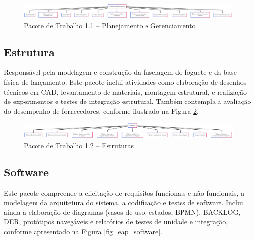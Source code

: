 \begin{figure}[H]
	\centering
\includegraphics[width=15cm]{figuras/eap_planejamento.png}
	\caption{Pacote de Trabalho 1.1 – Planejamento e Gerenciamento}
	\label{fig_eap_planejamento} 
\end{figure}

\subsection{Estrutura}

Responsável pela modelagem e construção da fuselagem do foguete e da base física de lançamento. Este pacote inclui atividades como elaboração de desenhos técnicos em CAD, levantamento de materiais, montagem estrutural, e realização de experimentos e testes de integração estrutural. Também contempla a avaliação do desempenho de fornecedores, conforme ilustrado na Figura \ref{fig_eap_estruturas}.

\begin{figure}[H]
	\centering
\includegraphics[width=15cm]{figuras/eap_estruturas.png}
	\caption{Pacote de Trabalho 1.2 – Estruturas}
	\label{fig_eap_estruturas} 
\end{figure}

\subsection{Software}

Este pacote compreende a elicitação de requisitos funcionais e não funcionais, a modelagem da arquitetura do sistema, a codificação e testes de software. Inclui ainda a elaboração de diagramas (casos de uso, estados, BPMN), BACKLOG, DER, protótipos navegáveis e relatórios de testes de unidade e integração, conforme apresentado na Figura \ref{fig_eap_software}.


